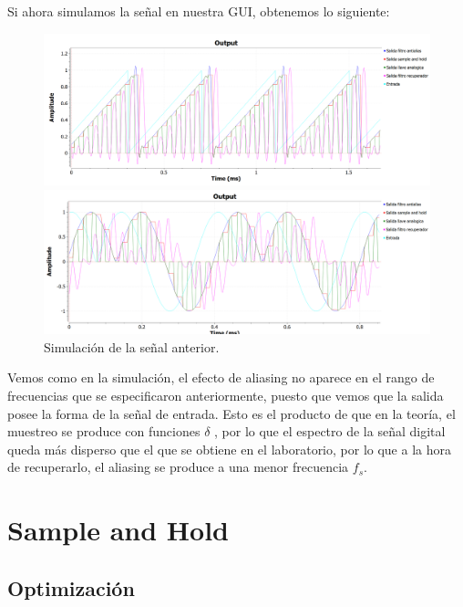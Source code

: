 \documentclass[../../ASSD_TP1_G7.tex]{subfiles}
\begin{document}
Si ahora simulamos la señal en nuestra GUI, obtenemos lo siguiente:

\begin{figure}[H]
\begin{centering}
\includegraphics[scale=0.5]{Imagenes/simulacion_llave_diente_d.PNG}
\par\end{centering}
\begin{centering}
\includegraphics[scale=0.5]{Imagenes/simulacion_llave_senoraro_d.PNG}\caption{Simulación de la señal anterior.}
\par\end{centering}
\end{figure}

Vemos como en la simulación, el efecto de aliasing no aparece en el
rango de frecuencias que se especificaron anteriormente, puesto que
vemos que la salida posee la forma de la señal de entrada. Esto es
el producto de que en la teoría, el muestreo se produce con funciones
$\delta$ , por lo que el espectro de la señal digital queda más disperso
que el que se obtiene en el laboratorio, por lo que a la hora de recuperarlo,
el aliasing se produce a una menor frecuencia $f_{s}$.

\section{Sample and Hold}

\subsection{Optimización}
\end{document}
